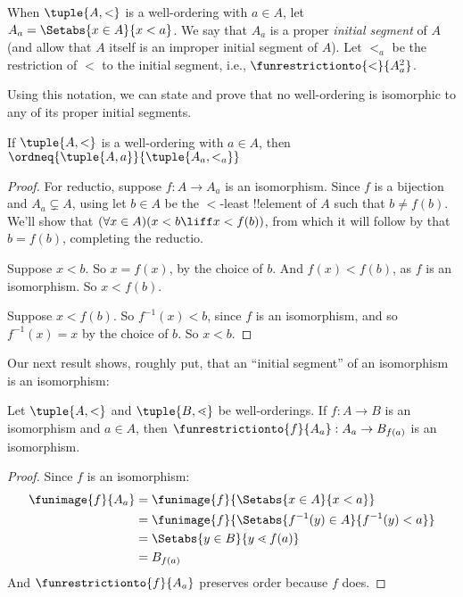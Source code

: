 \documentclass[../../../include/open-logic-section]{subfiles}
\begin{document}
\begin{defn}
When $\tuple{A, <}$ is a well-ordering with $a \in A$, let $A_a = \Setabs{x \in A}{x
< a}$. We say that $A_a$ is a proper \emph{initial segment} of $A$ (and allow that $A$ itself is an improper initial segment of $A$). Let
$<_a$ be the restriction of $<$ to the initial segment, i.e.,
$\funrestrictionto{\mathord{<}}{A_a^2}$. 
\end{defn}
\noindent
Using this notation, we can state and prove that no well-ordering is
isomorphic to any of its proper initial segments.

\begin{lem}
If $\tuple{A, <}$ is a well-ordering with $a \in A$, then
$\ordneq{\tuple{A, a}}{\tuple{A_a, <_a}}$ 
\end{lem}

\begin{proof}
For reductio, suppose $f \colon A \to A_a$ is an isomorphism. Since
$f$ is a bijection and $A_a \subsetneq A$, using  let $b \in A$ be the
$<$-least !!{element} of $A$ such that $b \neq f(b)$. We'll show that
$(\forall x \in A)(x<b \liff x < f(b))$, from which it will follow by
 that $b =
f(b)$, completing the reductio.

Suppose $x < b$. So $x = f(x)$, by the choice of $b$. And $f(x) <
f(b)$, as $f$ is an isomorphism. So $x < f(b)$.

Suppose $x < f(b)$. So $f^{-1}(x) < b$, since $f$ is an isomorphism,
and so $f^{-1}(x) = x$ by the choice of $b$. So $x < b$. 
\end{proof}

Our next result shows, roughly put, that an ``initial segment'' of an
isomorphism is an isomorphism:

\begin{lem}
Let $\tuple{A, <}$ and $\tuple{B, \lessdot}$ be well-orderings. If $f
\colon A \to B$ is an isomorphism and $a \in A$, then
$\funrestrictionto{f}{A_{a}} : A_a \to B_{f(a)}$ is an isomorphism.
\end{lem}

\begin{proof}
Since $f$ is an isomorphism:
\begin{align*}
	\funimage{f}{A_a} &= \funimage{f}{\Setabs{x \in A}{x < a}}\\
	&= \funimage{f}{\Setabs{f^{-1}(y) \in A}{f^{-1}(y) < a}} \\
	&= \Setabs{y \in B}{y \lessdot f(a)} \\
	&=B_{f(a)} 
\end{align*}
And $\funrestrictionto{f}{A_a}$ preserves order because $f$ does. 
\end{proof}
\end{document}
